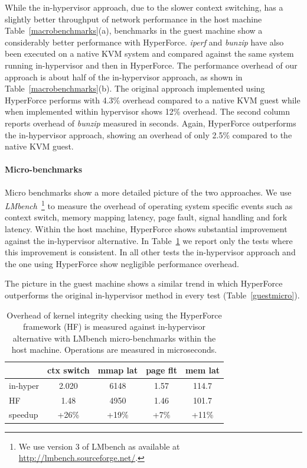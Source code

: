 While the in-hypervisor approach, due to the slower context switching, has a slightly better throughput of network performance in the host machine
Table~\ref{macrobenchmarks}(a), benchmarks in the guest machine show a considerably better performance with HyperForce.   
\emph{iperf} and \emph{bunzip} have also been executed on a native KVM system and compared against the same system running in-hypervisor and then in HyperForce. 
The performance overhead of our approach is about half of the in-hypervisor approach, as shown in Table~\ref{macrobenchmarks}(b). The original approach implemented using HyperForce performs with 4.3\% overhead compared to a native KVM guest while when implemented within hypervisor shows 12\% overhead.
The second column reports overhead of \textit{bunzip} measured in seconds. Again, HyperForce outperforms the in-hypervisor approach, showing an overhead of only 2.5\% compared to the native KVM guest.
  

\paragraph{Micro-benchmarks} \label{microbench}
Micro benchmarks show a more detailed picture of the two approaches. 
We use \emph{LMbench}~\cite{lmbench-paper}\footnote{We use version 3 of
LMbench as available at \url{http://lmbench.sourceforge.net/}.} to measure the overhead of operating system specific events such as context switch, memory mapping latency, page fault, signal handling and fork latency.
Within the host machine, HyperForce shows substantial improvement against the in-hypervisor alternative. 
In Table~\ref{hostmicro} we report only the tests where this improvement is consistent. In all other tests the in-hypervisor approach and the one using HyperForce show negligible performance overhead. 

The picture in the guest machine shows a similar trend in which HyperForce outperforms the original in-hypervisor method in every test (Table~\ref{guestmicro}).


\begin{table}[htdp]
\caption{Overhead of kernel integrity checking using the HyperForce framework (HF) is measured against in-hypervisor alternative with LMbench micro-benchmarks within the host machine. Operations are measured in microseconds.}
\begin{center}
\begin{tabular}{| l | c | c | c | c | }
\hline
~ & ctx switch  & mmap lat  & page flt 	 & mem lat \\
\hline
in-hyper     & 2.020  &	6148	&	1.57		&114.7  \\
HF		& 1.48    &	4950	&	1.46		& 101.7 \\
\hline
speedup         &+26\% & +19\% & +7\% & +11\% \\
\hline
\end{tabular}
\end{center}
\label{hostmicro}
\end{table}%

